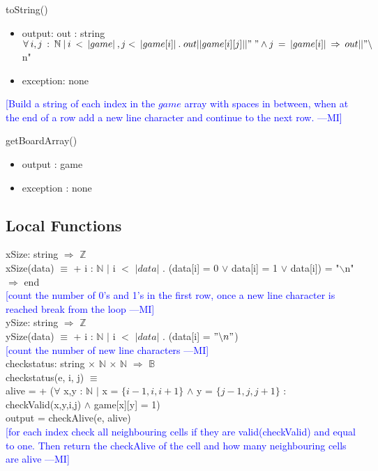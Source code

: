 \documentclass{article}
\newcommand{\authornote}[3]{\textcolor{#1}{[#3 ---#2]}}
\newcommand{\authornote}[3]{}
\newcommand{\wss}[1]{\authornote{blue}{MI}{#1}}
\begin{document}
\noindent toString()
\begin{itemize}
    \item output: out : string \\
     $\forall\: i,j\: : \: \mathbb{N}\: | \: i \: <\: |game|\:, j <\: |game[i]| \: .\; out||game[i][j]||"\;" \land \\
     j\: =\: |game[i]|\: \Rightarrow \: out||"\backslash$n"
    \item exception: none
\end{itemize}
\wss{Build a string of each index in the $game$ array with spaces in between, when at the end of a row add a new line character and continue to the next row.}

\noindent getBoardArray()
\begin{itemize}
    \item output : game
    \item exception : none
\end{itemize}
\subsection*{Local Functions}
xSize: string $\Rightarrow$ $\mathbb{Z}$ \\
xSize(data) $\equiv$ + i : $\mathbb{N}$ $|$ i $<$ $|data|$ . (data[i] = 0 $\lor$ data[i] = 1 $\lor$ data[i]) = "$\backslash$n" $\Rightarrow$ end \\
\wss{count the number of 0's and 1's in the first row, once a new line character is reached break from the loop}\\

\noindent ySize: string $\Rightarrow$ $\mathbb{Z}$ \\
ySize(data) $\equiv$ + i : $\mathbb{N}$ $|$ i $<$ $|data|$ . (data[i] = $"\backslash n"$) \\
\wss{count the number of new line characters} \\

\noindent checkstatus: string $\times$ $\mathbb{N}$ $\times$ $\mathbb{N}$ $\Rightarrow$ $\mathbb{B}$ \\
checkstatus(e, i, j) $\equiv$ \\
    \indent alive = + ($\forall$ x,y : $\mathbb{N}$ $|$ x = $\{i-1,i,i+1\}$ $\land$ y = $\{j-1,j,j+1\}$ : \\ \indent checkValid(x,y,i,j) $\land$ game[x][y] = 1)\\
output = checkAlive(e, alive) \\
\wss{for each index check all neighbouring cells if they are valid(checkValid) and equal to one. Then return the checkAlive of the cell and how many neighbouring cells are alive} \\
\end{document}

